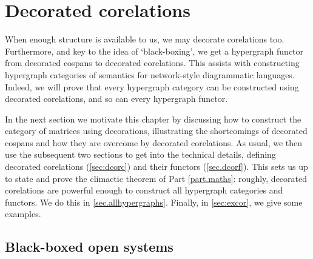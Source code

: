\chapter{Decorated corelations} \label{ch.deccorels}

When enough structure is available to us, we may decorate corelations too.
Furthermore, and key to the idea of `black-boxing', we get a hypergraph functor
from decorated cospans to decorated corelations. This assists with constructing
hypergraph categories of semantics for network-style diagrammatic languages.
Indeed, we will prove that every hypergraph category can be constructed using
decorated corelations, and so can every hypergraph functor.

In the next section we motivate this chapter by discussing how to construct the
category of matrices using decorations, illustrating the shortcomings of
decorated cospans and how they are overcome by decorated corelations. As usual,
we then use the subsequent two sections to get into the technical details,
defining decorated corelations (\textsection\ref{sec:dcorc}) and their functors
(\textsection\ref{sec.dcorf}). This sets us up to state and prove the climactic
theorem of Part \ref{part.maths}: roughly, decorated corelations are powerful
enough to construct all hypergraph categories and functors. We do this in
\textsection\ref{sec.allhypergraphs}. Finally, in \textsection\ref{sec:excor},
we give some examples.

\section{Black-boxed open systems} \label{sec.blackboxedsystems}

